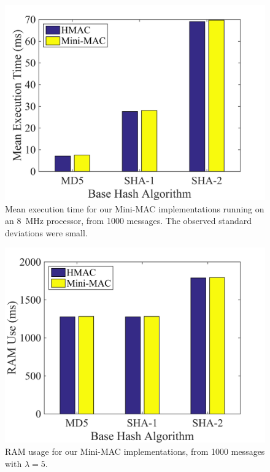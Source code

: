 	\begin{figure}
		\centering
		\includegraphics[width=\columnwidth]{figures/exec_cycles.png}
		\caption{Mean execution time for our Mini-MAC implementations running on an 8~MHz processor,
		from 1000 messages.  The observed standard deviations were small.}
		\label{fig-execution}
	\end{figure}
	
	\begin{figure}
		\centering
		\includegraphics[width=\columnwidth]{figures/ram_usage.png}
		\caption{RAM usage for our Mini-MAC implementations, from 1000 messages with $\lambda=5$.}
		\label{fig-ram}
	\end{figure}
	
